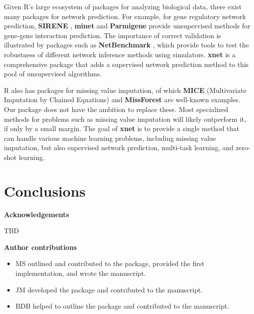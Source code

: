 \documentclass[
]{article}
\providecommand{\tightlist}{%
  \setlength{\itemsep}{0pt}\setlength{\parskip}{0pt}}
\begin{document}
Given R's large ecosystem of packages for analyzing biological data,
there exist many packages for network prediction. For example, for gene
regulatory network prediction, \textbf{SIRENE} \citep{Mordelet2008},
\textbf{minet} \citep{Meyer2008} and \textbf{Parmigene}
\citep{Sales2011} provide unsupervised methods for gene-gene interaction
prediction. The importance of correct validation is illustrated by
packages such as \textbf{NetBenchmark} \citep{Bellot2015a}, which
provide tools to test the robustness of different network inference
methods using simulators. \textbf{xnet} is a comprehensive package that
adds a supervised network prediction method to this pool of unsupervised
algorithms.

R also has packages for missing value imputation, of which \textbf{MICE}
(Multivariate Imputation by Chained Equations) \citep{VanBuuren2011} and
\textbf{MissForest} \citep{Stekhoven2012} are well-known examples. Our
package does not have the ambition to replace these. Most specialized
methods for problems such as missing value imputation will likely
outperform it, if only by a small margin. The goal of \textbf{xnet} is
to provide a single method that can handle various machine learning
problems, including missing value imputation, but also supervised
network prediction, multi-task learning, and zero-shot learning.

\hypertarget{conclusions}{%
\section{Conclusions}\label{conclusions}}

\textbf{Acknowledgements}

TBD

\textbf{Author contributions}

\begin{itemize}
\tightlist
\item
  MS outlined and contributed to the package, provided the first
  implementation, and wrote the manuscript.
\item
  JM developed the package and contributed to the manuscript.
\item
  BDB helped to outline the package and contributed to the manuscript.
\end{itemize}


\end{document}
